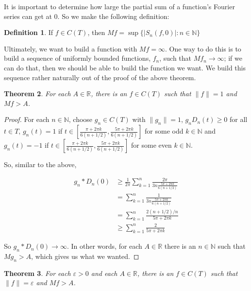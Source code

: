 \documentclass{amsart}
\newcommand{\vep}{\varepsilon}
\newcommand{\N}{\mathbb{N}}
\newcommand{\R}{\mathbb{R}}
\newcommand{\absval}[1]{\left| #1 \right|}
\newcommand{\norm}[1]{\|#1\|}
\newtheorem{thm}{Theorem}[section]
\theoremstyle{definition}
\newtheorem{definition}[thm]{Definition}
\begin{document}
It is important to determine how large the partial sum of a function's Fourier series can get at $0$. 
So we make the following definition:

\begin{definition}
If $f \in C(T)$, then $Mf = \sup\{\absval{S_n(f,0)} : n \in \N\}$ 
\end{definition}

Ultimately, we want to build a function with $Mf = \infty$.
One way to do this is to build a sequence of uniformly bounded functions, $f_n$, such that $Mf_n \to \infty$; 
if we can do that, then we should be able to build the function we want.
We build this sequence rather naturally out of the proof of the above theorem.

\begin{thm}
For each $A \in \R$, there is an $f \in C(T)$ such that $\norm{f} = 1$ and $Mf > A$. 
\end{thm}

\begin{proof}
For each $n \in \N$, choose $g_n \in C(T)$ with $\norm{g_n} = 1$, $g_nD_n(t) \geq 0$ for all $t \in T$,  $g_n(t) = 1$ if $t \in [\frac{\pi +2\pi k}{6(n+1/2)},\frac{5 \pi+2\pi k}{6(n+1/2)}]$ for some odd $k \in \N$  and $g_n(t) = -1$ if $t \in [\frac{\pi +2\pi k}{6(n+1/2)},\frac{5 \pi+2\pi k}{6(n+1/2)}]$ for some even $k \in \N$.

So, similar to the above,

\begin{align*}
g_n \ast D_n(0) &\geq \frac{1}{2 \pi} \sum\limits_{k=1}^n \frac{2 \pi}{3n \frac{5 \pi+2\pi k}{6(n+1/2)}}\\
&= \sum\limits_{k=1}^n \frac{1}{3n \frac{5 \pi+2\pi k}{6(n+1/2)}}\\
&= \sum\limits_{k=1}^n \frac{2(n+1/2)/{n}}{5 \pi+2\pi k}\\
&\geq \sum\limits_{k=1}^n \frac{2}{5 \pi+2\pi k}
\end{align*}

So $g_n \ast D_n(0) \to \infty$. In other words, for each $A \in \R$ there is an $n \in \N$ such that $Mg_n > A$, which gives us what we wanted.

\end{proof}

\begin{thm}
For each $\vep >0$ and each $A \in \R$, there is an $f \in C(T)$ such that $\norm{f} = \vep $ and $Mf > A$. 

\end{thm}
\end{document}
